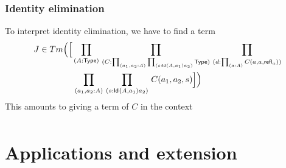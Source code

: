 \documentclass[handout,xcolor=dvipsnames]{beamer}
\renewcommand\type{\mathsf{Type}}
\begin{document}
\begin{frame}
  \frametitle{Identity elimination}
  To interpret identity elimination, we have to find a term
  \begin{align*}
  J 
  & \in Tm\Big(\Big[\prd{A:\type}{C:\prd{a_1,a_2:A}{s:\idtype{A}{a_1}{a_2}}\type}{d:\prd{a:A}C(a,a,\refl{a})}
    \\ 
  & {}\hspace{4em} \prd{a_1,a_2:A}{s:\idtype{A}{a_1}{a_2}}C(a_1,a_2,s)\Big]\Big)
  \end{align*}
  This amounts to giving a term of $C$ in the context
  \begin{align*}
  [A:\type, & \textstyle C:\prd{a_1,a_2:A}{s:Id_A(a_1,a_2)}\type, \\
  & \textstyle d: \prd{a:A}C(a,a,\refl{a}), a_1:A,a_2:A,s:\idtype{A}{a_1}{a_2}]
  \end{align*}
\end{frame}

\section{Applications and extension}
\end{document}
